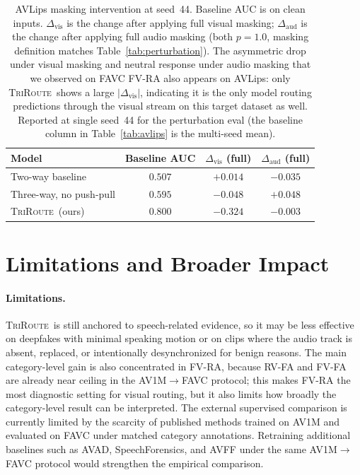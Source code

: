\documentclass{article}
\newcommand{\method}{\textsc{TriRoute}}
\begin{document}
\begin{table}[t]
    \centering
    \caption{AVLips masking intervention at seed~44. Baseline AUC is on clean inputs. $\Delta_\mathrm{vis}$ is the change after applying full visual masking; $\Delta_\mathrm{aud}$ is the change after applying full audio masking (both $p=1.0$, masking definition matches Table~\ref{tab:perturbation}). The asymmetric drop under visual masking and neutral response under audio masking that we observed on FAVC FV-RA also appears on AVLips: only \method\ shows a large $|\Delta_\mathrm{vis}|$, indicating it is the only model routing predictions through the visual stream on this target dataset as well. Reported at single seed~44 for the perturbation eval (the baseline column in Table~\ref{tab:avlips} is the multi-seed mean).}
    \label{tab:avlips_perturbation}
    \small
    \begin{tabular}{lccc}
        \toprule
        Model & Baseline AUC & $\Delta_\mathrm{vis}$ (full) & $\Delta_\mathrm{aud}$ (full) \\
        \midrule
        Two-way baseline        & $0.507$ & $+0.014$ & $-0.035$ \\
        Three-way, no push-pull & $0.595$ & $-0.048$ & $+0.048$ \\
        \method\ (ours)         & $\mathbf{0.800}$ & $\mathbf{-0.324}$ & $-0.003$ \\
        \bottomrule
    \end{tabular}
\end{table}

\section{Limitations and Broader Impact}

\paragraph{Limitations.}
\method\ is still anchored to speech-related evidence, so it may be less effective on deepfakes with minimal speaking motion or on clips where the audio track is absent, replaced, or intentionally desynchronized for benign reasons. The main category-level gain is also concentrated in FV-RA, because RV-FA and FV-FA are already near ceiling in the AV1M$\rightarrow$FAVC protocol; this makes FV-RA the most diagnostic setting for visual routing, but it also limits how broadly the category-level result can be interpreted. The external supervised comparison is currently limited by the scarcity of published methods trained on AV1M and evaluated on FAVC under matched category annotations. Retraining additional baselines such as AVAD, SpeechForensics, and AVFF under the same AV1M$\rightarrow$FAVC protocol would strengthen the empirical comparison.
\end{document}
